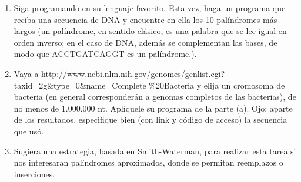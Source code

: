 \begin{enumerate}
\item Siga programando en su lenguaje favorito. Esta vez, haga un programa que reciba una
secuencia de DNA y encuentre en ella los 10 palíndromes más largos (un palíndrome, en
sentido clásico, es una palabra que se lee igual en orden inverso; en el caso de DNA, además se
complementan las bases, de modo que ACCTGATCAGGT es un palíndrome.).


\item Vaya a http://www.ncbi.nlm.nih.gov/genomes/genlist.cgi?taxid=2g\&type=0\&name=Complete
\%20Bacteria y elija un cromosoma de bacteria (en general corresponderán a genomas
completos de las bacterias), de no menos de 1.000.000 nt. Aplíquele su programa de la parte (a).
Ojo: aparte de los resultados, especifique bien (con link y código de acceso) la secuencia que
usó.

\item Sugiera una estrategia, basada en Smith-Waterman, para realizar esta tarea si nos interesaran
palíndromes aproximados, donde se permitan reemplazos o inserciones.


\end{enumerate}
